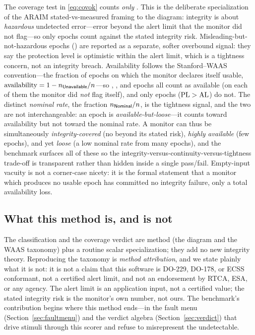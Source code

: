 The coverage test in \eqref{eq:covok} counts \emph{only} \HMI{}. This is the
deliberate specialization of the ARAIM stated-vs-measured framing
\citep{blanch2015} to the diagram: integrity is about \emph{hazardous} undetected
error---error beyond the alert limit that the monitor did not flag---so only \HMI{}
epochs count against the stated integrity risk. Misleading-but-not-hazardous
epochs (\MI{}) are reported as a separate, softer overbound signal: they say the
protection level is optimistic within the alert limit, which is a tightness
concern, not an integrity breach. Availability follows the Stanford--WAAS
convention---the fraction of epochs on which the monitor declares itself usable,
$\mathrm{availability}=1-n_{\textsf{Unavailable}{}}/n$---so \Nominal{}, \MI{}, and \HMI{}
epochs all count as available (on each of them the monitor did \emph{not} flag
itself), and only \Unavail{} epochs ($\mathrm{PL}>\mathrm{AL}$) do not. The distinct
\emph{nominal rate}, the \Nominal{} fraction $n_{\textsf{Nominal}{}}/n$, is the tightness
signal, and the two are not interchangeable: an \MI{} epoch is
\emph{available-but-loose}---it counts toward availability but not toward the
nominal rate. A monitor can thus be simultaneously \emph{integrity-covered} (no
\HMI{} beyond its stated risk), \emph{highly available} (few \Unavail{} epochs),
and yet \emph{loose} (a low nominal rate from many \MI{} epochs), and the benchmark
surfaces all of these so the integrity-versus-continuity-versus-tightness
trade-off is transparent rather than hidden inside a single pass/fail. Empty-input vacuity is not a corner-case nicety: it is the
formal statement that a monitor which produces no usable epoch has committed no
integrity failure, only a total availability loss.

\subsection{What this method is, and is not}
\label{sec:methodscope}

The classification and the coverage verdict are \Cited{} method (the diagram and
the WAAS taxonomy) plus a routine scalar specialization; they add no new integrity
theory. Reproducing the taxonomy is \emph{method attribution}, and we state
plainly what it is not: it is not a claim that this software is DO-229, DO-178, or
ECSS conformant, not a certified alert limit, and not an endorsement by RTCA, ESA,
or any agency. The alert limit is an application input, not a certified value; the
stated integrity risk is the monitor's own number, not ours. The benchmark's
contribution begins where this method ends---in the fault menu
(Section~\ref{sec:faultmenu}) and the verdict algebra
(Section~\ref{sec:verdict}) that drive stimuli through this scorer and refuse to
misrepresent the undetectable.
